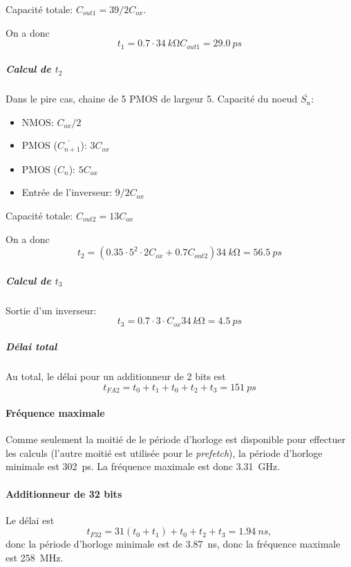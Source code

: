 \documentclass[frenchb,DIV=14]{scrartcl}
\begin{document}
Capacité totale: $C_{out1} = 39/2 C_{ox}$.

On a donc
\[t_1 = 0.7 \cdot \SI{34}{k\ohm} C_{out1} = \SI{29.0}{ps}\]

\subparagraph{Calcul de $t_2$}
Dans le pire cas, chaine de 5 PMOS de largeur 5.
Capacité du noeud $\overline{S_n}$:
\begin{itemize}
\item NMOS: $C_{ox}/2$
\item PMOS ($\overline{C_{n+1}}$): $3C_{ox}$
\item PMOS ($C_n$): $5C_{ox}$
\item Entrée de l'inverseur: $9/2 C_{ox}$
\end{itemize}
Capacité totale: $C_{out2} = 13 C_{ox}$

On a donc
\[t_2 = (0.35\cdot 5^2\cdot 2 C_{ox} + 0.7 C_{out2})\SI{34}{k\ohm} = \SI{56.5}{ps}\]

\subparagraph{Calcul de $t_3$}
Sortie d'un inverseur:
\[t_3 = 0.7 \cdot 3 \cdot C_{ox} \SI{34}{k\ohm} = \SI{4.5}{ps}\]

\subparagraph{Délai total}
Au total, le délai pour un additionneur de 2 bits est
\[t_{FA2} = t_0 + t_1 + t_0 + t_2 + t_3 = \SI{151}{ps}\]

\paragraph{Fréquence maximale}
Comme seulement la moitié de le période d'horloge est disponible pour
effectuer les calculs (l'autre moitié est utilisée pour le \emph{prefetch}),
la période d'horloge minimale est \SI{302}{ps}. La fréquence maximale est
donc \SI{3.31}{GHz}.

\paragraph{Additionneur de 32 bits}
Le délai est
\[t_{F32} = 31 (t_0 + t_1) + t_0 + t_2 + t_3 = \SI{1.94}{ns},\]
donc la période d'horloge minimale est de \SI{3.87}{ns}, donc la
fréquence maximale est \SI{258}{MHz}.
\end{document}
